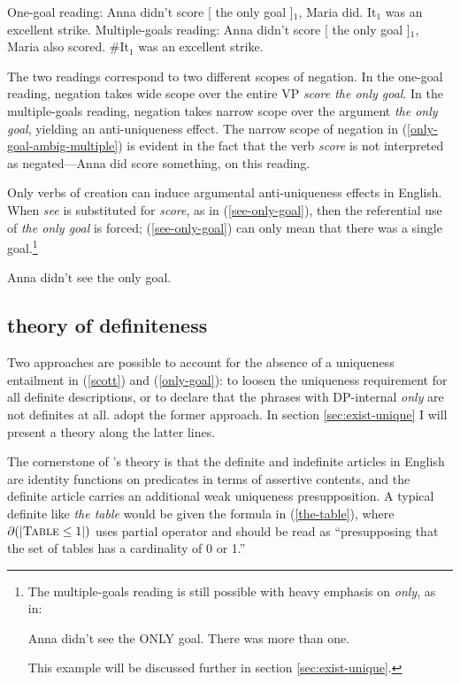 \begin{exe}
	\ex \label{only-goal-ambig-one} One-goal reading: Anna didn't score [ the only goal ]$_1$, Maria did. It$_1$ was an excellent strike.
	\ex \label{only-goal-ambig-multiple} Multiple-goals reading: Anna didn't score [ the only goal ]$_1$, Maria also scored. \#It$_1$ was an excellent strike.
\end{exe}

The two readings correspond to two different scopes of negation. In the one-goal reading, negation takes wide scope over the entire VP \textit{score the only goal}. In the multiple-goals reading, negation takes narrow scope over the argument \textit{the only goal}, yielding an anti-uniqueness effect. The narrow scope of negation in (\ref{only-goal-ambig-multiple}) is evident in the fact that the verb \textit{score} is not interpreted as negated---Anna did score something, on this reading.

Only verbs of creation can induce argumental anti-uniqueness effects in English. When \textit{see} is substituted for \textit{score}, as in (\ref{see-only-goal}), then the referential use of \textit{the only goal} is forced; (\ref{see-only-goal}) can only mean that there was a single goal.\footnote{The multiple-goals reading is still possible with heavy emphasis on \textit{only}, as in: \begin{exe} \ex Anna didn't see the ONLY goal. There was more than one. \end{exe} This example will be discussed further in section \ref{sec:exist-unique}.}

\begin{exe}
	\ex \label{see-only-goal} Anna didn't see the only goal.
\end{exe}

\subsection{ theory of definiteness}
Two approaches are possible to account for the absence of a uniqueness entailment in (\ref{scott}) and (\ref{only-goal}): to loosen the uniqueness requirement for all definite descriptions, or to declare that the phrases with DP-internal \textit{only} are not definites at all. \citeauthor{cb2015} adopt the former approach. In section \ref{sec:exist-unique} I will present a theory along the latter lines.

The cornerstone of \citeauthor{cb2015}'s theory is that the definite and indefinite articles in English are identity functions on predicates in terms of assertive contents, and the definite article carries an additional weak uniqueness presupposition. A typical definite like \textit{the table} would be given the formula in (\ref{the-table}), where $\partial(|\textsc{Table} \le 1|)$ uses  partial operator and should be read as ``presupposing that the set of tables has a cardinality of 0 or 1.''

